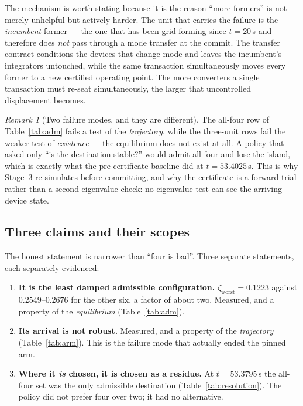 \documentclass[12pt,a4paper]{article}
\theoremstyle{remark}
\newtheorem{remark}{Remark}
\newcommand{\zworst}{\zeta_{\mathrm{worst}}}
\begin{document}
The mechanism is worth stating because it is the reason ``more formers'' is not
merely unhelpful but actively harder. The unit that carries the failure is the
\emph{incumbent} former --- the one that has been grid-forming since $t=20$\,s
and therefore does \emph{not} pass through a mode transfer at the commit. The
transfer contract conditions the devices that change mode and leaves the
incumbent's integrators untouched, while the same transaction simultaneously
moves every former to a new certified operating point. The more converters a
single transaction must re-seat simultaneously, the larger that uncontrolled
displacement becomes.

\begin{remark}[Two failure modes, and they are different]
The all-four row of Table~\ref{tab:adm} fails a test of the \emph{trajectory},
while the three-unit rows fail the weaker test of \emph{existence} --- the
equilibrium does not exist at all. A policy that asked only ``is the destination
stable?'' would admit all four and lose the island, which is exactly what the
pre-certificate baseline did at $t=53.4025$\,s. This is why Stage~3
re-simulates before committing, and why the certificate is a forward trial
rather than a second eigenvalue check: no eigenvalue test can see the arriving
device state.
\end{remark}

\subsection{Three claims and their scopes}

The honest statement is narrower than ``four is bad''. Three separate statements,
each separately evidenced:

\begin{enumerate}[leftmargin=1.7em,itemsep=3pt]
\item \textbf{It is the least damped admissible configuration.}
      $\zworst = 0.1223$ against $0.2549$--$0.2676$ for the other six, a factor
      of about two. Measured, and a property of the \emph{equilibrium}
      (Table~\ref{tab:adm}).
\item \textbf{Its arrival is not robust.} Measured, and a property of the
      \emph{trajectory} (Table~\ref{tab:arm}). This is the failure mode that
      actually ended the pinned arm.
\item \textbf{Where it \emph{is} chosen, it is chosen as a residue.} At
      $t=53.3795$\,s the all-four set was the only admissible destination
      (Table~\ref{tab:resolution}). The policy did not prefer four over two; it
      had no alternative.
\end{enumerate}
\end{document}
